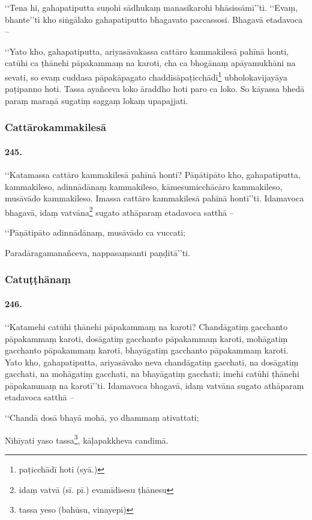 ‘‘Tena hi, gahapatiputta suṇohi sādhukaṃ manasikarohi bhāsissāmī’’ti. ‘‘Evaṃ, bhante’’ti kho siṅgālako gahapatiputto bhagavato paccassosi. Bhagavā etadavoca –

‘‘Yato kho, gahapatiputta, ariyasāvakassa cattāro kammakilesā pahīnā honti, catūhi ca ṭhānehi pāpakammaṃ na karoti, cha ca bhogānaṃ apāyamukhāni na sevati, so evaṃ cuddasa pāpakāpagato chaddisāpaṭicchādī\footnote{paṭicchādī hoti (syā.)} ubholokavijayāya paṭipanno hoti. Tassa ayañceva loko āraddho hoti paro ca loko. So kāyassa bhedā paraṃ maraṇā sugatiṃ saggaṃ lokaṃ upapajjati.

\subsubsection{Cattārokammakilesā}

\paragraph{245.} ‘‘Katamassa cattāro kammakilesā pahīnā honti? Pāṇātipāto kho, gahapatiputta, kammakileso, adinnādānaṃ kammakileso, kāmesumicchācāro kammakileso, musāvādo kammakileso. Imassa cattāro kammakilesā pahīnā hontī’’ti. Idamavoca bhagavā, idaṃ vatvāna\footnote{idaṃ vatvā (sī. pī.) evamīdisesu ṭhānesu} sugato athāparaṃ etadavoca satthā –

‘‘Pāṇātipāto adinnādānaṃ, musāvādo ca vuccati;

Paradāragamanañceva, nappasaṃsanti paṇḍitā’’ti.

\subsubsection{Catuṭṭhānaṃ}

\paragraph{246.} ‘‘Katamehi catūhi ṭhānehi pāpakammaṃ na karoti? Chandāgatiṃ gacchanto pāpakammaṃ karoti, dosāgatiṃ gacchanto pāpakammaṃ karoti, mohāgatiṃ gacchanto pāpakammaṃ karoti, bhayāgatiṃ gacchanto pāpakammaṃ karoti. Yato kho, gahapatiputta, ariyasāvako neva chandāgatiṃ gacchati, na dosāgatiṃ gacchati, na mohāgatiṃ gacchati, na bhayāgatiṃ gacchati; imehi catūhi ṭhānehi pāpakammaṃ na karotī’’ti. Idamavoca bhagavā, idaṃ vatvāna sugato athāparaṃ etadavoca satthā –

‘‘Chandā dosā bhayā mohā, yo dhammaṃ ativattati;

Nihīyati yaso tassa\footnote{tassa yeso (bahūsu, vinayepi)}, kāḷapakkheva candimā.

